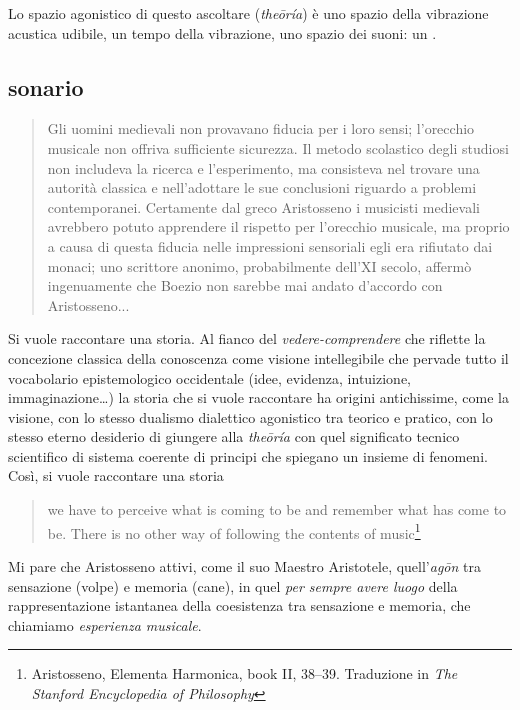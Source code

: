 \documentclass{gs}
\begin{document}
Lo spazio agonistico \cite{ronchi2001} di questo ascoltare (\emph{theōría}) è uno spazio della vibrazione acustica udibile, un tempo della vibrazione, uno spazio dei suoni: un . 

\subsection*{sonario}

\begin{quote}
\begin{sf}
\small
Gli uomini medievali non provavano fiducia per i loro sensi; l'orecchio musicale non offriva sufficiente sicurezza. Il metodo scolastico degli studiosi non includeva la ricerca e l'esperimento, ma consisteva nel trovare una autorità classica e nell'adottare le sue conclusioni riguardo a problemi contemporanei. Certamente dal greco Aristosseno i musicisti medievali avrebbero potuto apprendere il rispetto per l'orecchio musicale, ma proprio a causa di questa fiducia nelle impressioni sensoriali egli era rifiutato dai monaci; uno scrittore anonimo, probabilmente dell'XI secolo, affermò ingenuamente che Boezio non sarebbe mai andato d'accordo con Aristosseno... \cite{sachs1996}
\end{sf}
\end{quote}

Si vuole raccontare una storia. Al fianco del \emph{vedere-comprendere} che riflette la concezione classica della conoscenza come visione intellegibile che pervade tutto il vocabolario epistemologico occidentale (idee, evidenza, intuizione, immaginazione\ldots) la storia che si vuole raccontare ha origini antichissime, come la visione, con lo stesso dualismo dialettico agonistico tra teorico e pratico, con lo stesso eterno desiderio di giungere alla \emph{theōría} con quel significato tecnico scientifico di sistema coerente di principi che spiegano un insieme di fenomeni. Così, si vuole raccontare una storia %

\begin{quote}
\begin{sf}
\small
we have to perceive what is coming to be and remember what has come to be. There is no other way of following the contents of music\footnote{Aristosseno, Elementa Harmonica, book II, 38–39. Traduzione in \emph{The Stanford Encyclopedia of Philosophy}}
\end{sf}
\end{quote}

Mi pare che Aristosseno attivi, come il suo Maestro Aristotele, quell'\emph{agōn} \cite{ronchi2001} tra sensazione (volpe) e memoria (cane), in quel \emph{per sempre avere luogo} della rappresentazione istantanea della coesistenza tra sensazione e memoria, che chiamiamo \emph{esperienza musicale}.
\end{document}
